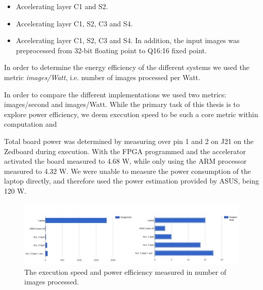\begin{itemize}
	\item Accelerating layer C1 and S2. 
	\item Accelerating layer C1, S2, C3 and S4.
	\item Accelerating layer C1, S2, C3 and S4. In addition, the input images was preprocessed from 32-bit floating point to Q16:16 fixed point. 
\end{itemize}

In order to determine the energy efficiency of the different systems we used the metric \textit{images/Watt}, i.e. number of images processed per Watt. 

In order to compare the different implementations we used two metrics: images/second and images/Watt. While the primary task of this thesis is to explore power efficiency, we deem execution speed to be such a core metric within computation and 

Total board power was determined by measuring over pin 1 and 2 on J21 on the Zedboard during execution. With the FPGA programmed and the accelerator activated the board measured to 4.68 W, while only using the ARM processor measured to 4.32 W. We were unable to measure the power consumption of the laptop directly, and therefore used the power estimation provided by ASUS, being 120 W.  

\begin{figure}[h!]
	\centering
	\includegraphics[width=1.0\textwidth]{Figures/Results/results_all_layers}
	\caption{The execution speed and power efficiency measured in number of images processed.}
	\label{fig_results_all_layers}
\end{figure}

